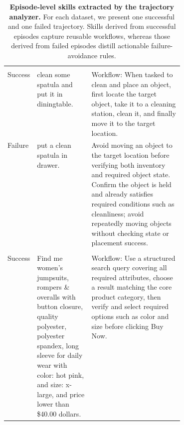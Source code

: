 
\begin{table}[ht!]
\centering
\small
\setlength{\tabcolsep}{4pt}
\renewcommand{\arraystretch}{1.15}
\caption{\textbf{Episode-level skills extracted by the trajectory analyzer.}
For each dataset, we present one successful and one failed trajectory.
Skills derived from successful episodes capture reusable workflows, whereas
those derived from failed episodes distill actionable failure-avoidance rules.}
\label{tab:episode_level_skills}
\vspace{0.1in}

\begin{tabularx}{\textwidth}{
  >{\raggedright\arraybackslash}p{0.10\linewidth}
  >{\raggedright\arraybackslash}p{0.31\linewidth}
  >{\raggedright\arraybackslash}X
}
\toprule
\multicolumn{1}{c}{\textbf{Outcome}} &
\multicolumn{1}{c}{\textbf{Task}} &
\multicolumn{1}{c}{\textbf{Episode-level skill}} \\
\midrule

\rowcolor{gray!15}
\multicolumn{3}{l}{\textbf{ALFWorld}} \\

Success &
clean some spatula and put it in diningtable. &
Workflow: When tasked to clean and place an object, first locate the target
object, take it to a cleaning station, clean it, and finally move it to the
target location. \\

Failure &
put a clean spatula in drawer. &
Avoid moving an object to the target location before verifying both inventory
and required object state. Confirm the object is held and already satisfies
required conditions such as cleanliness; avoid repeatedly moving objects
without checking state or placement success. \\

\addlinespace
\rowcolor{gray!15}
\multicolumn{3}{l}{\textbf{WebShop}} \\

Success &
Find me women's jumpsuits, rompers \& overalls with button closure, quality
polyester, polyester spandex, long sleeve for daily wear with color: hot pink,
and size: x-large, and price lower than \$40.00 dollars. &
Workflow: Use a structured search query covering all required attributes,
choose a result matching the core product category, then verify and select
required options such as color and size before clicking Buy Now. \\


\end{tabularx}
\end{table}
